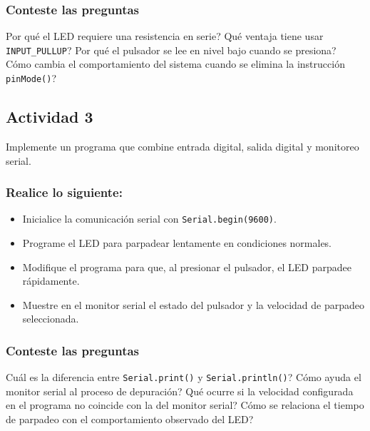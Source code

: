 \subsubsection{Conteste las preguntas}

\textquestiondown Por qué el LED requiere una resistencia en serie? \textquestiondown Qué ventaja tiene usar \texttt{INPUT\_PULLUP}? \textquestiondown Por qué el pulsador se lee en nivel bajo cuando se presiona? \textquestiondown Cómo cambia el comportamiento del sistema cuando se elimina la instrucción \texttt{pinMode()}?

\subsection{Actividad 3}

Implemente un programa que combine entrada digital, salida digital y monitoreo serial.

\subsubsection{Realice lo siguiente:}
\begin{itemize}
    \item Inicialice la comunicación serial con \texttt{Serial.begin(9600)}.
    \item Programe el LED para parpadear lentamente en condiciones normales.
    \item Modifique el programa para que, al presionar el pulsador, el LED parpadee rápidamente.
    \item Muestre en el monitor serial el estado del pulsador y la velocidad de parpadeo seleccionada.
\end{itemize}

\subsubsection{Conteste las preguntas}

\textquestiondown Cuál es la diferencia entre \texttt{Serial.print()} y \texttt{Serial.println()}? \textquestiondown Cómo ayuda el monitor serial al proceso de depuración? \textquestiondown Qué ocurre si la velocidad configurada en el programa no coincide con la del monitor serial? \textquestiondown Cómo se relaciona el tiempo de parpadeo con el comportamiento observado del LED?
